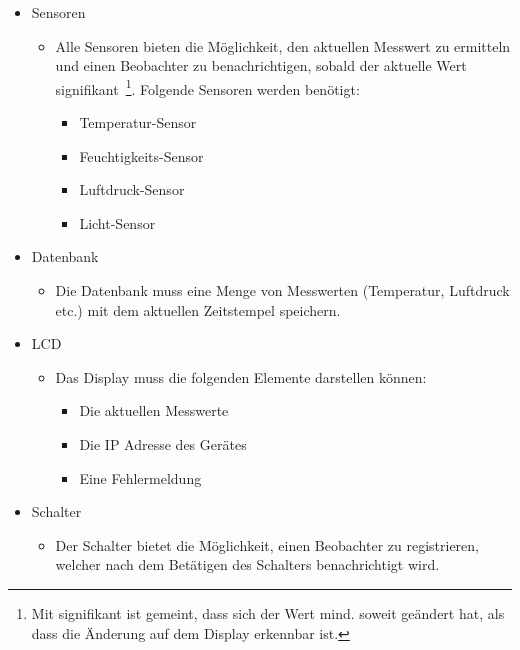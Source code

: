 \documentclass[
    10pt,
    a4paper,
]{scrartcl}
\begin{document}
\begin{itemize}
    \item Sensoren
        \begin{itemize}
            \item Alle Sensoren bieten die Möglichkeit, den aktuellen Messwert zu
                ermitteln und einen Beobachter zu benachrichtigen, sobald der aktuelle Wert
                signifikant~\footnote{Mit signifikant ist gemeint, dass sich der Wert mind. soweit
                geändert hat, als dass die Änderung auf dem Display erkennbar ist.}.
                Folgende Sensoren werden benötigt:
                \begin{itemize}
                    \item Temperatur-Sensor
                    \item Feuchtigkeits-Sensor
                    \item Luftdruck-Sensor
                    \item Licht-Sensor
                \end{itemize}
        \end{itemize}
    \item Datenbank
        \begin{itemize}
            \item Die Datenbank muss eine Menge von Messwerten (Temperatur, Luftdruck
                etc.) mit dem aktuellen Zeitstempel speichern.
        \end{itemize}
    \item LCD
        \begin{itemize}
            \item Das Display muss die folgenden Elemente darstellen können:
                \begin{itemize}
                    \item Die aktuellen Messwerte
                    \item Die IP Adresse des Gerätes
                    \item Eine Fehlermeldung
                \end{itemize}
        \end{itemize}
    \item Schalter
        \begin{itemize}
            \item Der Schalter bietet die Möglichkeit, einen Beobachter zu registrieren,
                welcher nach dem Betätigen des Schalters benachrichtigt wird.
        \end{itemize}
\end{itemize}
\end{document}
